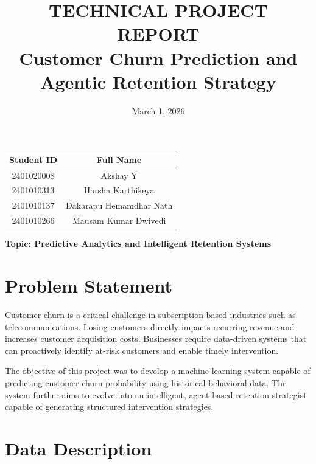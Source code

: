 \documentclass[12pt,a4paper]{article}
\title{\textbf{TECHNICAL PROJECT REPORT}\\
Customer Churn Prediction and Agentic Retention Strategy}
\date{March 1, 2026}
\begin{document}
\maketitle
\thispagestyle{empty}

\vspace{1cm}

\begin{center}
\begin{tabular}{|c|c|}
\hline
\textbf{Student ID} & \textbf{Full Name} \\
\hline
2401020008 & Akshay Y \\
2401010313 & Harsha Karthikeya \\
2401010137 & Dakarapu Hemamdhar Nath \\
2401010266 & Mausam Kumar Dwivedi \\
\hline
\end{tabular}
\end{center}

\vspace{1cm}

\begin{center}
\textbf{Topic: Predictive Analytics and Intelligent Retention Systems}
\end{center}

\newpage


\section{Problem Statement}

Customer churn is a critical challenge in subscription-based industries such as telecommunications. Losing customers directly impacts recurring revenue and increases customer acquisition costs. Businesses require data-driven systems that can proactively identify at-risk customers and enable timely intervention.

The objective of this project was to develop a machine learning system capable of predicting customer churn probability using historical behavioral data. The system further aims to evolve into an intelligent, agent-based retention strategist capable of generating structured intervention strategies.


\section{Data Description}
\end{document}
